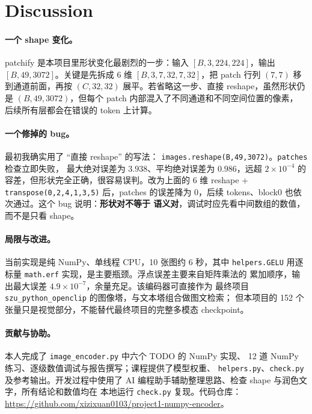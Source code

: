 \documentclass[a4paper,12pt]{article}
\begin{document}
\section{Discussion}

\paragraph{一个 shape 变化。}
patchify 是本项目里形状变化最剧烈的一步：输入
$[B,3,224,224]$，输出 $[B,49,3072]$。关键是先拆成 6 维
$[B,3,7,32,7,32]$，把 patch 行列 $(7,7)$ 移到通道前面，再按
$(C,32,32)$ 展平。若省略这一步、直接 reshape，虽然形状仍是
$(B,49,3072)$，但每个 patch 内部混入了不同通道和不同空间位置的像素，
后续所有层都会在错误的 token 上计算。

\paragraph{一个修掉的 bug。}
最初我确实用了 ``直接 reshape'' 的写法：
\texttt{images.reshape(B,49,3072)}。\texttt{patches} 检查立即失败，
最大绝对误差为 $3.938$、平均绝对误差为 $0.986$，远超
$2\times10^{-4}$ 的容差，但形状完全正确，很容易误判。改为上面的
6 维 reshape + \texttt{transpose(0,2,4,1,3,5)} 后，patches 的误差降为
$0$，后续 tokens、block0 也依次通过。这个 bug 说明：\textbf{形状对不等于
语义对}，调试时应先看中间数组的数值，而不是只看 shape。

\paragraph{局限与改进。}
当前实现是纯 NumPy、单线程 CPU，10 张图约 6 秒，其中 \texttt{helpers.GELU}
用逐标量 \texttt{math.erf} 实现，是主要瓶颈。浮点误差主要来自矩阵乘法的
累加顺序，输出最大误差 $4.9\times10^{-7}$，余量充足。该编码器可直接作为
最终项目 \texttt{szu\_python\_openclip} 的图像塔，与文本塔组合做图文检索；
但本项目的 152 个张量只是视觉部分，不能替代最终项目的完整多模态
checkpoint。

\paragraph{贡献与协助。}
本人完成了 \texttt{image\_encoder.py} 中六个 TODO 的 NumPy 实现、
12 道 NumPy 练习、逐级数值调试与报告撰写；课程提供了模型权重、
\texttt{helpers.py}、\texttt{check.py} 及参考输出。开发过程中使用了
AI 编程助手辅助整理思路、检查 shape 与润色文字，所有结论和数值均在
本地运行 \texttt{check.py} 复现。代码仓库：
\url{https://github.com/xizixuan0103/project1-numpy-encoder}。
\end{document}
